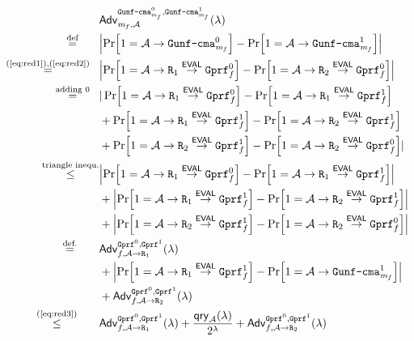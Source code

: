 \documentclass[a4paper,table,dvipsnames]{article}
\theoremstyle{definition}
\newcommand{\M}[1]{\ensuremath{\text{\texttt{#1}}}}
\renewcommand{\O}[1]{\ensuremath{\mathsf{#1}}}
\newcommand{\pcvar}[1]{\ensuremath{\mathit{#1}}}
\newcommand{\m}{\pcvar{m}} %
\begin{document}
\begin{align*}
 &\mathsf{Adv}^{\M{Gunf\text{-}cma}_{\m_f}^0,\M{Gunf\text{-}cma}_{\m_f}^1}_{\m_f,\adv}(\lambda)\\
\stackrel{\text{def}}{=}\;\;\;\;\;\;\,
 &\abs{\prob{1=\adv\rightarrow\M{Gunf\text{-}cma}_{\m_f}^0}-\prob{1=\adv\rightarrow\M{Gunf\text{-}cma}_{\m_f}^1}}\\
\stackrel{\text{(\ref{eq:red1}),(\ref{eq:red2})}}{=}\;\;\;
&\abs{\prob{1=\adv\rightarrow\M{R}_1\stackrel{\O{EVAL}}{\rightarrow}\M{Gprf}^0_f}-\prob{1=\adv\rightarrow\M{R}_2\stackrel{\O{EVAL}}{\rightarrow}\M{Gprf}^0_f}}\\
\stackrel{\text{adding }0}{=}\;\;\;
&|\prob{1=\adv\rightarrow\M{R}_1\stackrel{\O{EVAL}}{\rightarrow}\M{Gprf}^0_f}-\prob{1=\adv\rightarrow\M{R}_1\stackrel{\O{EVAL}}{\rightarrow}\M{Gprf}^1_f}\\
&+\prob{1=\adv\rightarrow\M{R}_1\stackrel{\O{EVAL}}{\rightarrow}\M{Gprf}^1_f}-\prob{1=\adv\rightarrow\M{R}_2\stackrel{\O{EVAL}}{\rightarrow}\M{Gprf}^1_f}\\
&+\prob{1=\adv\rightarrow\M{R}_2\stackrel{\O{EVAL}}{\rightarrow}\M{Gprf}^1_f}-\prob{1=\adv\rightarrow\M{R}_2\stackrel{\O{EVAL}}{\rightarrow}\M{Gprf}^0_f}|\\
\stackrel{\text{triangle inequ.}}{\leq}
&\abs{\prob{1=\adv\rightarrow\M{R}_1\stackrel{\O{EVAL}}{\rightarrow}\M{Gprf}^0_f}-\prob{1=\adv\rightarrow\M{R}_1\stackrel{\O{EVAL}}{\rightarrow}\M{Gprf}^1_f}}\\
&+\abs{\prob{1=\adv\rightarrow\M{R}_1\stackrel{\O{EVAL}}{\rightarrow}\M{Gprf}^1_f}-\prob{1=\adv\rightarrow\M{R}_2\stackrel{\O{EVAL}}{\rightarrow}\M{Gprf}^1_f}}\\
&+\abs{\prob{1=\adv\rightarrow\M{R}_2\stackrel{\O{EVAL}}{\rightarrow}\M{Gprf}^1_f}-\prob{1=\adv\rightarrow\M{R}_2\stackrel{\O{EVAL}}{\rightarrow}\M{Gprf}^0_f}}\\
\stackrel{\text{def.}}{=}\;\;\;\;\;\;\;
&\mathsf{Adv}^{\M{Gprf}^0,\M{Gprf}^1}_{f,\adv\rightarrow\M{R}_1}(\lambda)\\
&+\abs{\prob{1=\adv\rightarrow\M{R}_1\stackrel{\O{EVAL}}{\rightarrow}\M{Gprf}^1_f}
-\prob{1=\adv\rightarrow\M{Gunf\text{-}cma}_{\m_f}^1}}\\
&+\mathsf{Adv}^{\M{Gprf}^0,\M{Gprf}^1}_{f,\adv\rightarrow\M{R}_2}(\lambda)\\
\stackrel{\text{(\ref{eq:red3})}}{\leq}\;\;\;\;\;\;\;&
\mathsf{Adv}^{\M{Gprf}^0,\M{Gprf}^1}_{f,\adv\rightarrow\M{R}_1}(\lambda)
+\frac{\O{qry}_{\adv}(\lambda)}{2^\lambda}
+\mathsf{Adv}^{\M{Gprf}^0,\M{Gprf}^1}_{f,\adv\rightarrow\M{R}_2}(\lambda)
\end{align*}
\end{document}
